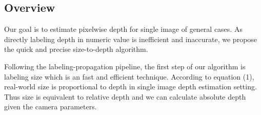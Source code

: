 \documentclass[10pt,twocolumn,letterpaper]{article}
\begin{document}
\subsection{Overview}
Our goal is to estimate pixelwise depth for single image of general cases. As directly labeling depth in numeric value is inefficient and inaccurate, we propose the quick and precise size-to-depth algorithm.

Following the labeling-propagation pipeline, the first step of our algorithm is labeling size which is an fast and efficient technique. According to equation (1), real-world size is proportional to depth in single image depth estimation setting. Thus size is equivalent to relative depth and we can calculate absolute depth given the camera parameters.
\end{document}
